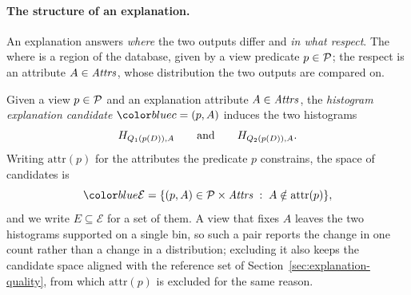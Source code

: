 \paragraph{The structure of an explanation.}
An explanation answers \emph{where} the two outputs differ and \emph{in what respect}.
The where is a region of the database, given by a view predicate $p\in\mathcal{P}$; the respect is an attribute $A\in\mathit{Attrs}$, whose distribution the two outputs are compared on.

\begin{definition}
\label{def:candidate}
Given a view $p\in\mathcal{P}$ and an explanation attribute $A\in\mathit{Attrs}$, the \emph{histogram explanation candidate} $\added{c}=(p,A)$ induces the two histograms
\[
    H_{Q_1(p(D)),A}
    \qquad\text{and}\qquad
    H_{Q_2(p(D)),A}.
\]
Writing $\mathrm{attr}(p)$ for the attributes the predicate $p$ constrains, the space of candidates is
\[
\added{\mathcal{E}}=\{(p,A)\in\views\times\Attrs \;:\; A\notin\mathrm{attr}(p)\},
\]
and we write $E\subseteq\mathcal{E}$ for a set of them.
A view that fixes $A$ leaves the two histograms supported on a single bin, so such a pair reports the change in one count rather than a change in a distribution; excluding it also keeps the candidate space aligned with the reference set of Section~\ref{sec:explanation-quality}, from which $\mathrm{attr}(p)$ is excluded for the same reason.
\end{definition}

